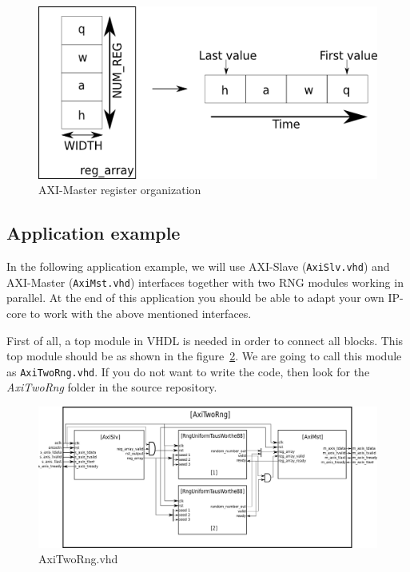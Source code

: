 \begin{figure}[!h]
\includegraphics[scale=0.5]{images/axiMstReg.png}
\caption{AXI-Master register organization}
\label{f10}
\end{figure}

\subsection{Application example}

In the following application example, we will use AXI-Slave ({\tt AxiSlv.vhd}) and AXI-Master ({\tt AxiMst.vhd}) interfaces together with two RNG modules working in parallel. At the end of this application you should be able to adapt your own IP-core to work with the above mentioned interfaces.

First of all, a top module in VHDL is needed in order to connect all blocks. This top module should be as shown in the figure~\ref{f11}.  We are going to call this module as {\tt AxiTwoRng.vhd}. If you do not want to write the code, then look for the {\it AxiTwoRng} folder in the source repository.

\begin{figure}[!h]
\includegraphics[scale=0.4]{images/axiTwoRngBlock.png}
\caption{AxiTwoRng.vhd}
\label{f11}
\end{figure}

